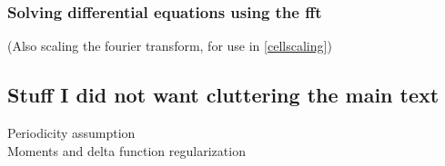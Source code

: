 \documentclass[a4paper,twoside=false,abstract=false,numbers=noenddot,
titlepage=false,headings=small,parskip=half,version=last]{scrartcl}
\begin{document}
\subsubsection{Solving differential equations using the fft}
(Also scaling the fourier transform, for use in \ref{cellscaling})
\subsection{Stuff I did not want cluttering the main text}
Periodicity assumption\\
Moments and delta function regularization
\end{document}
